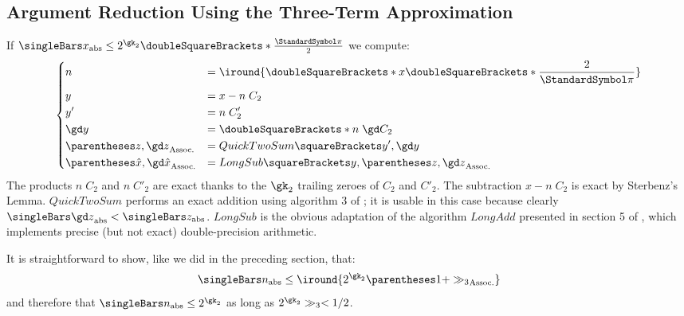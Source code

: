\documentclass[10pt, a4paper, twoside]{basestyle}
\newcommand{\round}[1]{\doubleSquareBrackets*{#1}}
\begin{document}
\subsection*{Argument Reduction Using the Three-Term Approximation}
If $\abs x \leq 2^{\gk_2} \round{\frac{\Pi}{2}}$ we compute:
\[
\begin{dcases}
n &= \iround{\round{x \round{\frac{2}{\Pi}}}} \\
y &= x - n \; C_2 \\
y' &= n \; C'_2 \\
\gd y &= \round{n \; \gd C_2} \\
\pa{z, \gd z} &= QuickTwoSum\of{y', \gd y} \\
\pa{\hat x, \gd \hat x} &= LongSub\of{y, \pa{z, \gd z}}
\end{dcases}
\]
The products $n \; C_2$ and $n \; C'_2$ are exact thanks to the $\gk_2$ trailing zeroes of $C_2$ and $C'_2$.  The subtraction $x - n \; C_2$ is exact by Sterbenz's Lemma.  $QuickTwoSum$ performs an exact addition using algorithm 3 of \cite{HidaLiBailey2007}; it is usable in this case because clearly $\abs{\gd z} < \abs z$.
$LongSub$ is the obvious adaptation of the algorithm $LongAdd$ presented in section 5 of \cite{Linnainmaa1981}, which implements precise (but not exact) double-precision arithmetic.

It is straightforward to show, like we did in the preceding section, that:
\[
\abs n \leq \iround{2^{\gk_2} \pa{1 + \gg_3}}
\]
and therefore that $\abs n \leq 2^{\gk_2}$ as long as $2^{\gk_2} \gg_3 < 1/2$.
\end{document}
